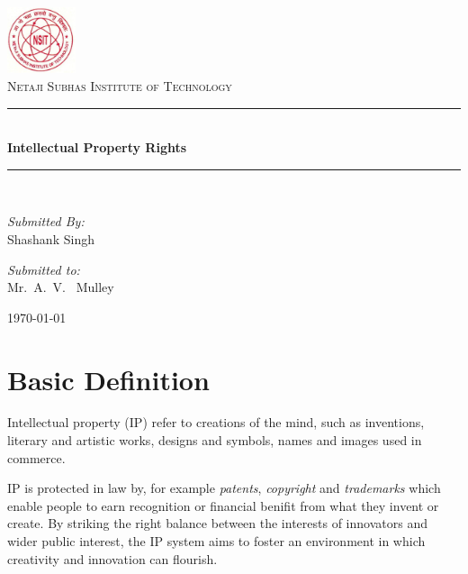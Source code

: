 \documentclass[a4paper,11pt]{article}
\newcommand{\HRule}{\rule{\linewidth}{0.5mm}}
\begin{document}
\begin{titlepage}
\begin{center}

\includegraphics[width=0.15\textwidth]{./nsitlogo}~\\[1cm]

\textsc{\LARGE Netaji Subhas Institute of Technology}\\[1.5cm]
\vfill
\HRule \\[0.4cm]
{\huge \bfseries Intellectual Property Rights \\[0.4cm] }

\HRule \\[1.5cm]

\vfill

\begin{minipage}[t]{0.4\textwidth}
\begin{flushleft} \large
\emph{Submitted By:} \\
Shashank Singh
\end{flushleft}
\end{minipage}
\begin{minipage}[t]{0.4\textwidth}
\begin{flushright} \large
\emph{Submitted to:} \\
Mr.~A.~V.~ Mulley
\end{flushright}
\end{minipage}

\vfill

{\large \today}

\end{center}
\end{titlepage}

\newpage
\tableofcontents

\newpage

\section{Basic Definition}
Intellectual property (IP) refer to creations of the mind, such as inventions,
literary and artistic works, designs and symbols, names and images used in
commerce.

IP is protected in law by, for example \emph{patents}\cite{patents},
\emph{copyright}\cite{copyright} and \emph{trademarks}\cite{trademarks} which
enable people to earn recognition or financial benifit from what they invent or
create. By striking the right balance between the interests of innovators and
wider public interest, the IP system aims to foster an environment in which
creativity and innovation can flourish.
\end{document}
